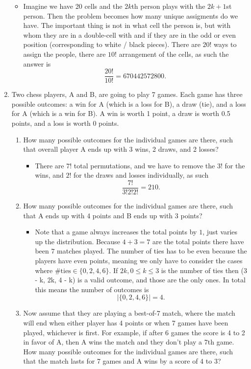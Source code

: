 \documentclass{article}
\begin{document}
\begin{enumerate}
\begin{itemize}
			\item Imagine we have 20 cells and the $2k$th person plays with the $2k + 1$st person. Then the problem becomes how many unique assigments do we have. The important thing is not in what cell the person is, but with whom they are in a double-cell with and if they are in the odd or even position (corresponding to white / black pieces). There are $20!$ ways to assign the people, there are $10!$ arrangement of the cells, as such the answer is
			$$
			\frac{20!}{10!} = 670442572800.
			$$
		\end{itemize}
	\item Two chess players, A and B, are going to play 7 games. Each game has three possible outcomes: a win for A (which is a loss for B), a draw (tie), and a loss for A (which is a win for B). A win is worth 1 point, a draw is worth 0.5 points, and a loss is worth 0 points.
		\begin{enumerate}
			\item How many possible outcomes for the individual games are there, such that overall player A ends up with 3 wins, 2 draws, and 2 losses?
				\begin{itemize}
					\item There are $7!$ total permutations, and we have to remove the $3!$ for the wins, and $2!$ for the draws and losses individually, as such
					$$
					\frac{7!}{3!2!2!} = 210.
					$$
				\end{itemize}
			\item How many possible outcomes for the individual games are there, such that A ends up with 4 points and B ends up with 3 points?
				\begin{itemize}
					\item Note that a game always increases the total points by $1$, just varies up the distribution. Because $4 + 3 = 7$ are the total points there have been $7$ matches played. The number of ties has to be even because the players have even points, meaning we only have to consider the cases where $\#\text{ties} \in \{0, 2, 4, 6\}$. If $2k, 0 \leq k \leq 3$ is the number of ties then (3 - k, 2k, 4 - k) is a valid outcome, and those are the only ones. In total this means the number of outcomes is
					$$
					|\{0, 2, 4, 6\}| = 4.
					$$
				\end{itemize}
			\item Now assume that they are playing a best-of-7 match, where the match will end when either player has 4 points or when 7 games have been played, whichever is first. For example, if after 6 games the score is 4 to 2 in favor of A, then A wins the match and they don’t play a 7th game. How many possible outcomes for the individual games are there, such that the match lasts for 7 games and A wins by a score of 4 to 3?

\end{enumerate}
\end{enumerate}
\end{document}
